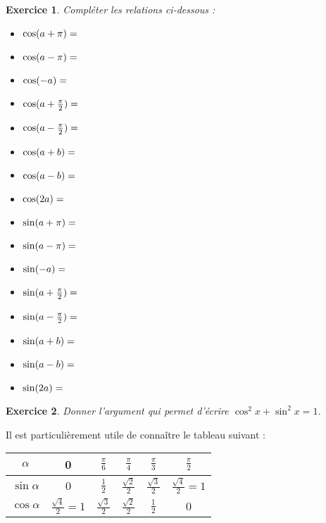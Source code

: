 \documentclass[11pt,a4paper,french]{article}
\theoremstyle{break}
\theoremstyle{plain}
\newtheorem{exerciceT}{Exercice}
\theoremstyle{nonumberplain}
\theoremstyle{nonumberbreak}
\newenvironment{exercice}{\begin{framed}\begin{exerciceT}}{\end{exerciceT}\end{framed}}
\begin{document}
\begin{exercice}
  Compléter les relations ci-dessous :
  \begin{multicols}{2}
    \begin{itemize}
      \item $\cos (a+\pi) = \dotfill$
      \item $\cos (a-\pi) = \dotfill$
      \item $\cos (-a) = \dotfill$
      \item $\cos (a+\frac{\pi}2) = \dotfill$
      \item $\cos (a-\frac{\pi}2) = \dotfill$
      \item $\cos (a+b) = \dotfill$
      \item $\cos (a-b) = \dotfill$
      \item $\cos (2a) = \dotfill$
      \item $\sin (a+\pi) = \dotfill$
      \item $\sin (a-\pi) = \dotfill$
      \item $\sin (-a) = \dotfill$
      \item $\sin (a+\frac{\pi}2) = \dotfill$
      \item $\sin (a-\frac{\pi}2) = \dotfill$
      \item $\sin (a+b) = \dotfill$
      \item $\sin (a-b) = \dotfill$
      \item $\sin (2a) = \dotfill$
    \end{itemize}
  \end{multicols}
\end{exercice}

\begin{exercice}
  Donner l'argument qui permet d'écrire $\cos^2 x + \sin^2 x = 1$.
\end{exercice}

Il est particulièrement utile de connaître le tableau suivant :

\begin{center}
  \begin{tabular}{%
      |c|*{5}{c|}%
    } \hline
    $\alpha$ & 0 & $\frac{\pi}6$ &  $\frac{\pi}4$ &  $\frac{\pi}3$ &
    $\frac{\pi}2$ \\ \hline
    $\sin \alpha$ & 0 & $\frac12$ & $\frac{\sqrt{2}}2$ &
    $\frac{\sqrt{3}}2$ & $\frac{\sqrt{4}}{2} = 1$ \\ \hline
    $\cos \alpha$ & $\frac{\sqrt{4}}2 = 1$ & $\frac{\sqrt{3}}2$ &
    $\frac{\sqrt{2}}2$ & $\frac{1}{2}$ & 0 \\ \hline
  \end{tabular}
\end{center}
\end{document}
